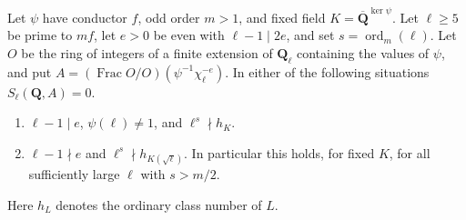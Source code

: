 \begin{proposition}\label{newcoh:oddzero}
Let \(\psi\) have conductor \(f\), odd order \(m>1\), and fixed field
\(K=\overline{\mathbf Q}^{\ker\psi}\). Let \(\ell\ge5\) be prime
to \(mf\), let \(e>0\) be even with \(\ell-1\mid2e\), and set
\(s=\operatorname{ord}_m(\ell)\). Let \(O\) be the ring of integers
of a finite extension of \(\mathbf Q_\ell\) containing the values of
\(\psi\), and put \(A=(\operatorname{Frac}O/O)(\psi^{-1}\chi_\ell^{-e})\).
In either of the following situations \(S_\ell(\mathbf Q,A)=0\).
\begin{enumerate}
\item \(\ell-1\mid e\), \(\psi(\ell)\ne1\), and \(\ell^s\nmid h_K\).
\item \(\ell-1\nmid e\) and \(\ell^s\nmid h_{K(\sqrt{\ell})}\).
In particular this holds, for fixed \(K\), for all sufficiently large
\(\ell\) with \(s>m/2\).
\end{enumerate}
Here \(h_L\) denotes the ordinary class number of \(L\).
\end{proposition}
